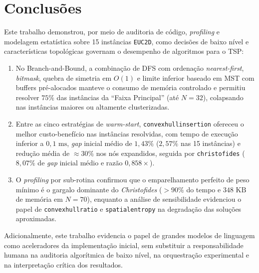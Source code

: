 \documentclass[12pt,a4paper]{article}
\renewcommand{\_}{\origunderscore\hspace{0pt}}
\begin{document}
\section{Conclusões}
Este trabalho demonstrou, por meio de auditoria de código, \textit{profiling} e modelagem estatística sobre 15 instâncias \texttt{EUC\_2D}, como decisões de baixo nível e características topológicas governam o desempenho de algoritmos para o TSP:
\begin{enumerate}
    \item No Branch-and-Bound, a combinação de DFS com ordenação \textit{nearest-first}, \textit{bitmask}, quebra de simetria em $O(1)$ e limite inferior baseado em MST com buffers pré-alocados manteve o consumo de memória controlado e permitiu resolver $75\%$ das instâncias da ``Faixa Principal'' (até $N=32$), colapsando nas instâncias maiores ou altamente clusterizadas.
    \item Entre as cinco estratégias de \textit{warm-start}, \texttt{convex\_hull\_insertion} ofereceu o melhor custo-benefício nas instâncias resolvidas, com tempo de execução inferior a $0{,}1\text{ ms}$, \textit{gap} inicial médio de $1{,}43\%$ ($2{,}57\%$ nas 15 instâncias) e redução média de $\approx 30\%$ nos nós expandidos, seguida por \texttt{christofides} ($8{,}07\%$ de \textit{gap} inicial médio e razão $0{,}858\times$).
    \item O \textit{profiling} por sub-rotina confirmou que o emparelhamento perfeito de peso mínimo é o gargalo dominante do \textit{Christofides} ($>90\%$ do tempo e $348\text{ KB}$ de memória em $N=70$), enquanto a análise de sensibilidade evidenciou o papel de \texttt{convex\_hull\_ratio} e \texttt{spatial\_entropy} na degradação das soluções aproximadas.
\end{enumerate}
Adicionalmente, este trabalho evidencia o papel de grandes modelos de linguagem como aceleradores da implementação inicial, sem substituir a responsabilidade humana na auditoria algorítmica de baixo nível, na orquestração experimental e na interpretação crítica dos resultados. 
\end{document}
